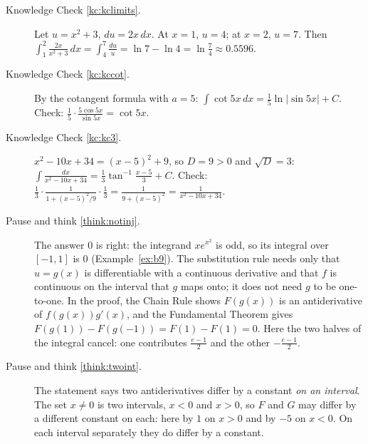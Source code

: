 \documentclass[11pt]{article}
\begin{document}
\begin{description}
  \item[Knowledge Check \ref{kc:kclimits}.] Let $u=x^2+3$, $du=2x\,dx$. At $x=1$, $u=4$; at $x=2$, $u=7$. Then $\int_1^2\frac{2x}{x^2+3}\,dx=\int_4^7\frac{du}u=\ln7-\ln4=\ln\frac74\approx0.5596$.

  \item[Knowledge Check \ref{kc:kccot}.] By the cotangent formula with $a=5$: $\int\cot5x\,dx=\frac15\ln\lvert\sin5x\rvert+C$. Check: $\frac15\cdot\frac{5\cos5x}{\sin5x}=\cot5x$.

  \item[Knowledge Check \ref{kc:kc3}.] $x^2-10x+34=(x-5)^2+9$, so $D=9>0$ and $\sqrt D=3$: $\int\frac{dx}{x^2-10x+34}=\frac13\tan^{-1}\frac{x-5}3+C$. Check: $\frac13\cdot\frac1{1+(x-5)^2/9}\cdot\frac13=\frac1{9+(x-5)^2}=\frac1{x^2-10x+34}$.

  \item[Pause and think \ref{think:notinj}.] The answer $0$ is right: the integrand $xe^{x^2}$ is odd, so its integral over $[-1,1]$ is $0$ (Example~\ref{ex:b9}). The substitution rule needs only that $u=g(x)$ is differentiable with a continuous derivative and that $f$ is continuous on the interval that $g$ maps onto; it does not need $g$ to be one-to-one. In the proof, the Chain Rule shows $F(g(x))$ is an antiderivative of $f(g(x))g'(x)$, and the Fundamental Theorem gives $F(g(1))-F(g(-1))=F(1)-F(1)=0$. Here the two halves of the integral cancel: one contributes $\frac{e-1}2$ and the other $-\frac{e-1}2$.

  \item[Pause and think \ref{think:twoint}.] The statement says two antiderivatives differ by a constant \emph{on an interval}. The set $x\ne0$ is two intervals, $x<0$ and $x>0$, so $F$ and $G$ may differ by a different constant on each: here by $1$ on $x>0$ and by $-5$ on $x<0$. On each interval separately they do differ by a constant.


\end{description}
\end{document}
